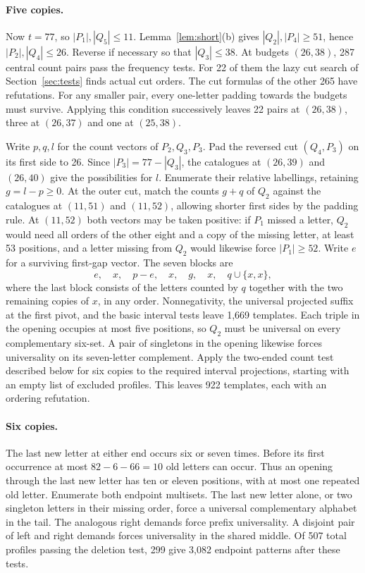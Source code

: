 \documentclass[11pt]{article}
\begin{document}
\paragraph{Five copies.}
Now $t=77$, so $|P_1|,|Q_5|\le11$. Lemma~\ref{lem:short}(b) gives $|Q_2|,|P_4|\ge51$, hence $|P_2|,|Q_4|\le26$. Reverse if necessary so that $|Q_3|\le38$. At budgets $(26,38)$, 287 central count pairs pass the frequency tests. For 22 of them the lazy cut search of Section~\ref{sec:tests} finds actual cut orders. The cut formulas of the other 265 have refutations. For any smaller pair, every one-letter padding towards the budgets must survive. Applying this condition successively leaves 22 pairs at $(26,38)$, three at $(26,37)$ and one at $(25,38)$.

Write $p,q,l$ for the count vectors of $P_2,Q_3,P_3$. Pad the reversed cut $(Q_4,P_3)$ on its first side to 26. Since $|P_3|=77-|Q_3|$, the catalogues at $(26,39)$ and $(26,40)$ give the possibilities for $l$. Enumerate their relative labellings, retaining $g=l-p\ge0$. At the outer cut, match the counts $g+q$ of $Q_2$ against the catalogues at $(11,51)$ and $(11,52)$, allowing shorter first sides by the padding rule. At $(11,52)$ both vectors may be taken positive: if $P_1$ missed a letter, $Q_2$ would need all orders of the other eight and a copy of the missing letter, at least 53 positions, and a letter missing from $Q_2$ would likewise force $|P_1|\ge52$. Write $e$ for a surviving first-gap vector. The seven blocks are
\[
             e,\quad x,\quad p-e,\quad x,\quad g,\quad x,\quad q\cup\{x,x\},
\]
where the last block consists of the letters counted by $q$ together with the two remaining copies of $x$, in any order. Nonnegativity, the universal projected suffix at the first pivot, and the basic interval tests leave 1,669 templates. Each triple in the opening occupies at most five positions, so $Q_2$ must be universal on every complementary six-set. A pair of singletons in the opening likewise forces universality on its seven-letter complement. Apply the two-ended count test described below for six copies to the required interval projections, starting with an empty list of excluded profiles. This leaves 922 templates, each with an ordering refutation.

\paragraph{Six copies.}
The last new letter at either end occurs six or seven times. Before its first occurrence at most $82-6-66=10$ old letters can occur. Thus an opening through the last new letter has ten or eleven positions, with at most one repeated old letter. Enumerate both endpoint multisets. The last new letter alone, or two singleton letters in their missing order, force a universal complementary alphabet in the tail. The analogous right demands force prefix universality. A disjoint pair of left and right demands forces universality in the shared middle. Of 507 total profiles passing the deletion test, 299 give 3,082 endpoint patterns after these tests.
\end{document}
